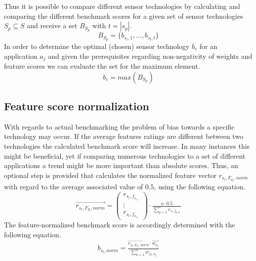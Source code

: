 Thus it is possible to compare different sensor technologies by calculating and comparing the different benchmark scores for a given set of sensor technologies $S_p\subseteq S$ and receive a set $B_{S_p}$ with $t=\left | s_p\right |$.
\begin{equation}
B_{S_p}=\{b_{s_l,1},\hdots,b_{s_l,t}\}
\end{equation}
In order to determine the optimal (chosen) sensor technology $b_c$ for an application $a_j$ and given the prerequisites regarding non-negativity of weights and feature scores we can evaluate the set for the maximum element.
\begin{equation}
b_c=max(B_{S_p})
\end{equation}

\subsection{Feature score normalization}
With regards to actual benchmarking the problem of bias towards a specific technology may occur. If the average features ratings are different between two technologies the calculated benchmark score will increase. In many instances this might be beneficial, yet if comparing numerous technologies to a set of different applications a trend might be more important than absolute scores. Thus, an optional step is provided that calculates the normalized feature vector $r_{s_l,F_{d_i},norm}$ with regard to the average associated value of $0.5$, using the following equation.
\begin{equation}
\overrightarrow{r_{s_l,F_{d_i},norm}}= \begin{pmatrix}
r_{s_l,f_{1,_i}}\\ 
\vdots\\
r_{s_l,f_{o,_i}}
\end{pmatrix}
\cdot \tfrac{o\cdot0.5}{\sum_{p=1}^{o}r_{s_l,f_{p,d_i}}}
\end{equation} 
The feature-normalized benchmark score is accordingly determined with the following equation.
\begin{equation}
b_{s_l,norm}=\tfrac{\overrightarrow{r_{s_l,F_{d_i},norm}}\cdot \overrightarrow{w_{a_j}}}{\sum_{k=1}^{o}w_{f_k,a_j}}
\end{equation}

